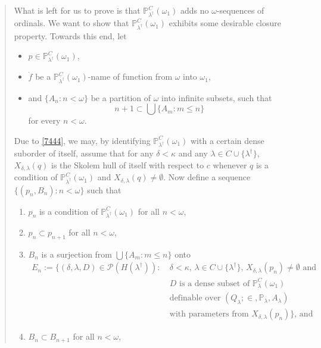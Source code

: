 \documentclass[12pt, twoside]{memoir}
\numberwithin{equation}{section}
\theoremstyle{definition}
\theoremstyle{remark}
\theoremstyle{definition}
\theoremstyle{definition}
\theoremstyle{definition}
\theoremstyle{remark}
\begin{document}
\begin{quote}
What is left for us to prove is that $\mathbb{P}^C_{\lambda^{\dagger}}(\omega_1)$ adds no $\omega$-sequences of ordinals. We want to show that $\mathbb{P}^C_{\lambda^{\dagger}}(\omega_1)$ exhibits some desirable closure property. Towards this end, let 
\begin{itemize}
    \item $p \in \mathbb{P}^C_{\lambda^{\dagger}}(\omega_1)$, 
    \item $\dot{f}$ be a $\mathbb{P}^C_{\lambda^{\dagger}}(\omega_1)$-name of function from $\omega$ into $\omega_1$, 
    \item and $\{A_n : n < \omega\}$ be a partition of $\omega$ into infinite subsets, such that
    \begin{equation*}
        n + 1 \subset \bigcup \{A_m : m \leq n\}
    \end{equation*}
    for every $n < \omega$.
\end{itemize}
Due to \ref{7444}, we may, by identifying $\mathbb{P}^C_{\lambda^{\dagger}}(\omega_1)$ with a certain dense suborder of itself, assume that for any $\delta < \kappa$ and any $\lambda \in C \cup \{\lambda^{\dagger}\}$, $X_{\delta, \lambda}(q)$ is the Skolem hull of itself with respect to $c$ whenever $q$ is a condition of $\mathbb{P}^C_{\lambda^{\dagger}}(\omega_1)$ and $X_{\delta, \lambda}(q) \neq \emptyset$. Now define a sequence $\{(p_n, B_n) : n < \omega\}$ such that
\begin{enumerate}[label=(\roman*)]
    \item\label{744i} $p_n$ is a condition of $\mathbb{P}^C_{\lambda^{\dagger}}(\omega_1)$ for all $n < \omega$,
    \item $p_n \subset p_{n+1}$ for all $n < \omega$,
    \item\label{744iii} $B_n$ is a surjection from $\bigcup \{A_m : m \leq n\}$ onto 
    \begin{align*}
        E_n := \{(\delta, \lambda, D) \in \mathcal{P}(H(\lambda^{\dagger})): \ & \delta < \kappa \text{, } \lambda \in C \cup \{\lambda^{\dagger}\} \text{, } X_{\delta, \lambda}(p_n) \neq \emptyset \text{ and} \\ 
        & D \text{ is a dense subset of } \mathbb{P}^C_{\lambda}(\omega_1) \\ 
        & \text{definable over } (Q_{\lambda}; \in, \mathbb{P}_{\lambda}, A_{\lambda}) \\
        & \text{with parameters from } X_{\delta, \lambda}(p_n)\} \text{, and}
    \end{align*}
    \item\label{744iv} $B_n \subset B_{n+1}$ for all $n < \omega$, 

\end{enumerate}
\end{quote}
\end{document}
